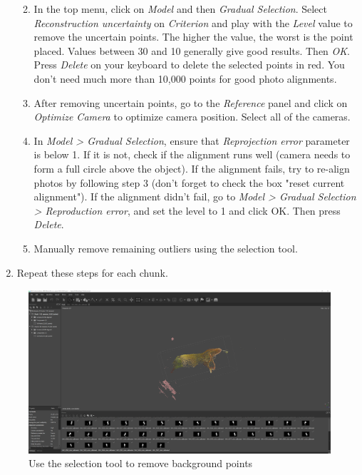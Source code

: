 \documentclass[
]{book}
\begin{document}
\begin{enumerate}
  \begin{enumerate}
  \def\labelenumii{\arabic{enumii}.}
  \item
    In the top menu, click on \emph{Model} and then \emph{Gradual Selection}.
    Select \emph{Reconstruction uncertainty} on \emph{Criterion} and play with
    the \emph{Level} value to remove the uncertain points. The higher the
    value, the worst is the point placed. Values between 30 and 10
    generally give good results. Then \emph{OK}. Press \emph{Delete} on your
    keyboard to delete the selected points in red. You don't need
    much more than 10,000 points for good photo alignments.
  \item
    After removing uncertain points, go to the \emph{Reference} panel and
    click on \emph{Optimize Camera} to optimize camera position. Select
    all of the cameras.
  \item
    In \emph{Model \textgreater{} Gradual Selection}, ensure that \emph{Reprojection
    error} parameter is below 1. If it is not, check if the
    alignment runs well (camera needs to form a full circle above
    the object). If the alignment fails, try to re-align photos by
    following step 3 (don't forget to check the box "reset current
    alignment"). If the alignment didn't fail, go to \emph{Model \textgreater{}
    Gradual Selection \textgreater{} Reproduction error}, and set the level to 1
    and click OK. Then press \emph{Delete}.
  \item
    Manually remove remaining outliers using the selection tool.
  \end{enumerate}
\item
  Repeat these steps for each chunk.
\end{enumerate}

\begin{figure}
\hypertarget{model_orientation1}{%
\centering
\includegraphics[width=1\textwidth,height=\textheight]{Figures/metashape_delete_selectedpoints.png}
\caption{Use the selection tool to remove background
points}\label{model_orientation1}
}
\end{figure}
\end{document}
